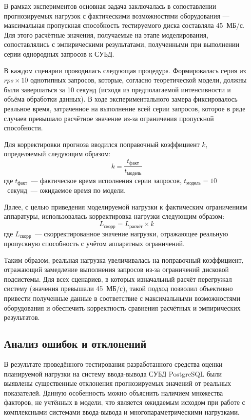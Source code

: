 В рамках экспериментов основная задача заключалась в сопоставлении прогнозируемых нагрузок с фактическими возможностями 
оборудования — максимальная пропускная способность тестируемого диска составляла 45~МБ/с. Для этого расчётные значения, 
получаемые на этапе моделирования, сопоставлялись с эмпирическими результатами, полученными при выполнении серии однородных запросов к СУБД.

В каждом сценарии проводилась следующая процедура. Формировалась серия из $rps \times 10$ однотипных запросов, 
которые, согласно теоретической модели, должны были завершаться за 10 секунд (исходя из предполагаемой интенсивности 
и объёма обработки данных). В ходе экспериментального замера фиксировалось реальное время, затраченное на выполнение 
всей серии запросов, которое в ряде случаев превышало расчётное значение из-за ограничения пропускной способности.

Для корректировки прогноза вводился поправочный коэффициент $k$, определяемый следующим образом:
\begin{equation}
    k = \frac{t_{\text{факт}}}{t_{\text{модель}}}
\end{equation}
где $t_{\text{факт}}$~--- фактическое время исполнения серии запросов, $t_{\text{модель}} = 10$~секунд~--- ожидаемое время по модели.

Далее, с целью приведения моделируемой нагрузки к фактическим ограничениям аппаратуры, использовалась корректировка нагрузки следующим образом:
\begin{equation}
    L_{\text{скорр}} = L_{\text{расчёт}} \times k
\end{equation}
где $L_{\text{скорр}}$~--- скорректированное значение нагрузки, отражающее реальную пропускную способность с учётом аппаратных ограничений.

Таким образом, реальная нагрузка увеличивалась на поправочный коэффициент, отражающий замедление выполнения запросов из-за ограничений дисковой подсистемы. 
Для всех сценариев, в которых изначальный расчёт перегружал систему (значения превышали 45~МБ/с), 
такой подход позволил объективно привести полученные данные в соответствие с максимальными возможностями 
оборудования и обеспечить корректность сравнения расчётных и эмпирических результатов.

\subsection{Анализ ошибок и отклонений}

В результате проведённого тестирования разработанного средства оценки планируемой нагрузки на систему ввода-вывода СУБД PostgreSQL 
были выявлены существенные отклонения прогнозируемых значений от реальных показателей. Данную особенность можно объяснить наличием 
множества факторов, не учтённых в модели, что является ожидаемым исходом при работе с комплексными системами ввода-вывода и многопараметрическими нагрузками.


